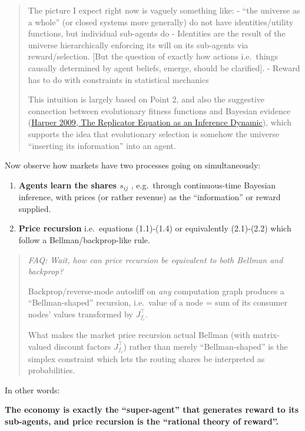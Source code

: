 \begin{quote}
The picture I expect right now is vaguely something like: - ``the universe as a whole'' (or closed systems more generally) do not have identities/utility functions, but individual sub-agents do - Identities are the result of the universe hierarchically enforcing its will on its sub-agents via reward/selection. {[}But the question of exactly how actions i.e.~things causally determined by agent beliefs, emerge, should be clarified{]}. - Reward has to do with constraints in statistical mechanics

This intuition is largely based on Point 2, and also the suggestive connection between evolutionary fitness functions and Bayesian evidence (\href{https://arxiv.org/abs/0911.1763}{Harper 2009, The Replicator Equation as an Inference Dynamic}), which supports the idea that evolutionary selection is somehow the universe ``inserting its information'' into an agent.
\end{quote}

Now observe how markets have two processes going on simultaneously:

\begin{enumerate}
\def\labelenumi{\arabic{enumi}.}
\tightlist
\item
  \textbf{Agents learn the shares \(s_{ij}\)} , e.g.~through continuous-time Bayesian inference, with prices (or rather revenue) as the ``information'' or reward supplied.
\item
  \textbf{Price recursion} i.e.~equations (1.1)-(1.4) or equivalently (2.1)-(2.2) which follow a Bellman/backprop-like rule.
\end{enumerate}

\begin{quote}
\emph{FAQ: Wait, how can price recursion be equivalent to both Bellman and backprop?}

Backprop/reverse-mode autodiff on \emph{any} computation graph produces a ``Bellman-shaped'' recursion, i.e.~value of a node = sum of its consumer nodes' values transformed by \(J_{f_i}^\top\).

What makes the market price recursion actual Bellman (with matrix-valued discount factors \(J_{f_i}^\top\)) rather than merely ``Bellman-shaped'' is the simplex constraint which lets the routing shares be interpreted as probabilities.
\end{quote}

In other words:

\textbf{The economy is exactly the ``super-agent'' that generates reward to its sub-agents, and price recursion is the ``rational theory of reward''.}

